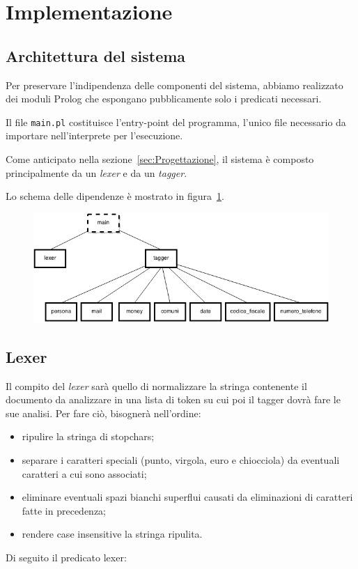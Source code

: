 \section{Implementazione}

\subsection{Architettura del sistema}
Per preservare l'indipendenza delle componenti del sistema, abbiamo realizzato dei moduli Prolog che espongano pubblicamente solo i predicati necessari.

Il file \verb+main.pl+ costituisce l'entry-point del programma, l'unico file necessario da importare nell'interprete per l'esecuzione.

Come anticipato nella sezione~\ref{sec:Progettazione}, il sistema è composto principalmente da un \emph{lexer} e da un \emph{tagger}.

Lo schema delle dipendenze è mostrato in figura~\ref{fig:moduli}.

\begin{figure}[h!tbp]
\includegraphics[width=\textwidth]{img/struttura_moduli.png}
\label{fig:moduli}
\end{figure}

\subsection{Lexer}
Il compito del \emph{lexer} sarà quello di normalizzare la stringa contenente il documento da analizzare in una lista di token su cui poi il tagger dovrà fare le sue analisi. Per fare ciò, bisognerà nell'ordine: 
\begin{itemize}
    \item ripulire la stringa di stopchars;
    \item separare i caratteri speciali (punto, virgola, euro e chiocciola) da eventuali caratteri a cui sono associati;
    \item eliminare eventuali spazi bianchi superflui causati da eliminazioni di caratteri fatte in precedenza;
    \item rendere case insensitive la stringa ripulita.
\end{itemize}
Di seguito il predicato lexer:

